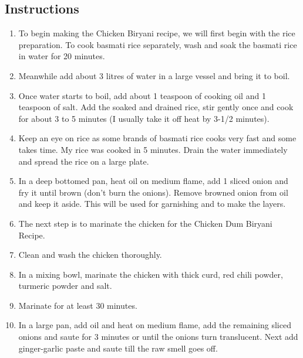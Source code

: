 \documentclass{article}
\begin{document}
        \subsection{Instructions}
        \begin{enumerate}
            \item To begin making the Chicken Biryani recipe, we will first begin with the rice preparation. To cook basmati rice separately, wash and soak the basmati rice in water for 20 minutes.

            \item Meanwhile add about 3 litres of water in a large vessel and bring it to boil.
            
            \item Once water starts to boil, add about 1 teaspoon of cooking oil and 1 teaspoon of salt. Add the soaked and drained rice, stir gently once and cook for about 3 to 5 minutes (I usually take it off heat by 3-1/2 minutes).
            
            \item Keep an eye on rice as some brands of basmati rice cooks very fast and some takes time. My rice was cooked in 5 minutes. Drain the water immediately and spread the rice on a large plate.
            
            \item In a deep bottomed pan, heat oil on medium flame,  add 1 sliced onion and fry it until brown (don’t burn the onions). Remove browned onion from oil and keep it aside. This will be used for garnishing and to make the layers.
            
            \item The next step is to marinate the chicken for the Chicken Dum Biryani Recipe.
            
            \item Clean and wash the chicken thoroughly.
            
            \item In a mixing bowl, marinate the chicken with thick curd, red chili powder, turmeric powder and salt.
            
            \item Marinate for at least 30 minutes. 
            
            \item In a large pan, add oil and heat on medium flame, add the remaining sliced onions and saute for 3 minutes or until the onions turn translucent. Next add ginger-garlic paste and saute till the raw smell goes off.
            

\end{enumerate}
\end{document}
